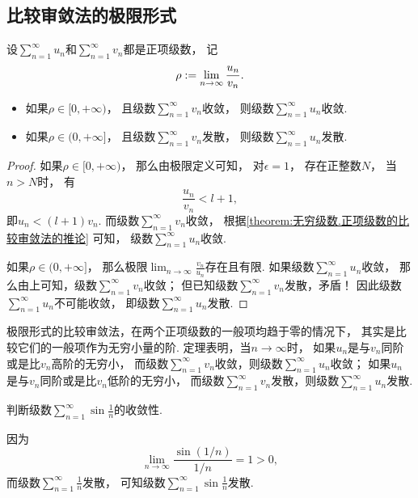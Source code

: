 \subsection{比较审敛法的极限形式}
\begin{theorem}[比较审敛法的极限形式]\label{theorem:无穷级数.正项级数的比较审敛法的极限形式}
设\(\sum_{n=1}^\infty u_n\)和\(\sum_{n=1}^\infty v_n\)都是正项级数，
记\[
	\rho
	:=
	\lim_{n\to\infty} \frac{u_n}{v_n}.
\]
\begin{itemize}
	\item 如果\(\rho\in[0,+\infty)\)，
	且级数\(\sum_{n=1}^\infty v_n\)收敛，
	则级数\(\sum_{n=1}^\infty u_n\)收敛.

	\item 如果\(\rho\in(0,+\infty]\)，
	且级数\(\sum_{n=1}^\infty v_n\)发散，
	则级数\(\sum_{n=1}^\infty u_n\)发散.
\end{itemize}
\begin{proof}
如果\(\rho\in[0,+\infty)\)，
那么由极限定义可知，
对\(\epsilon=1\)，
存在正整数\(N\)，
当\(n>N\)时，
有\[
	\frac{u_n}{v_n} < l+1,
\]
即\(u_n < (l+1) v_n\).
而级数\(\sum_{n=1}^\infty v_n\)收敛，
根据\cref{theorem:无穷级数.正项级数的比较审敛法的推论} 可知，
级数\(\sum_{n=1}^\infty u_n\)收敛.

如果\(\rho\in(0,+\infty]\)，
那么极限\(\lim_{n\to\infty} \frac{v_n}{u_n}\)存在且有限.
如果级数\(\sum_{n=1}^\infty u_n\)收敛，
那么由上可知，级数\(\sum_{n=1}^\infty v_n\)收敛；
但已知级数\(\sum_{n=1}^\infty v_n\)发散，矛盾！
因此级数\(\sum_{n=1}^\infty u_n\)不可能收敛，
即级数\(\sum_{n=1}^\infty u_n\)发散.
\end{proof}
\end{theorem}

极限形式的比较审敛法，在两个正项级数的一般项均趋于零的情况下，
其实是比较它们的一般项作为无穷小量的阶.
定理表明，当\(n \to \infty\)时，
如果\(u_n\)是与\(v_n\)同阶或是比\(v_n\)高阶的无穷小，
而级数\(\sum_{n=1}^\infty v_n\)收敛，则级数\(\sum_{n=1}^\infty u_n\)收敛；
如果\(u_n\)是与\(v_n\)同阶或是比\(v_n\)低阶的无穷小，
而级数\(\sum_{n=1}^\infty v_n\)发散，则级数\(\sum_{n=1}^\infty u_n\)发散.

\begin{example}
判断级数\(\sum_{n=1}^\infty \sin\frac{1}{n}\)的收敛性.
\begin{solution}
因为\[
	\lim_{n\to\infty} \frac{\sin(1/n)}{1/n} = 1 > 0,
\]
而级数\(\sum_{n=1}^\infty \frac{1}{n}\)发散，
可知级数\(\sum_{n=1}^\infty \sin\frac{1}{n}\)发散.
\end{solution}
\end{example}

